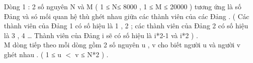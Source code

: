 Dòng 1 : 2 số nguyên N và M ( 1 ≤ N≤ 8000 , 1 ≤ M ≤ 20000 ) tương ứng là số Đảng và só mối quan hệ thù ghét nhau giữa các thành viên của các Đảng . ( Các thành viên của Đảng 1 có số hiệu là 1 , 2 ; các thành viên của Đảng 2 có số hiệu là 3 , 4 … Thành viên của Đảng i sẽ có số hiệu là i*2-1 và i*2 ) .   
\\   M dòng tiếp theo mỗi dòng gồm 2 số nguyên u , v cho biết người u và người v ghét nhau . ( 1 ≤ u $<$ v ≤ N*2 ) .